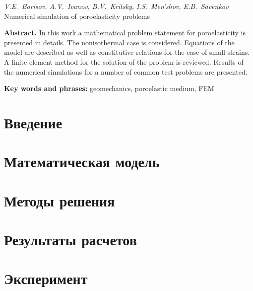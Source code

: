 \documentclass[a4paper, 12pt]{article}
\begin{document}
\noindent\emph{ V.E.~Borisov, \; A.V.~Ivanov, \; B.V.~Kritsky, \; I.S.~Men'shov, \; E.B.~Savenkov} \\Numerical simulation of poroelasticity problems

\vspace*{3mm}

\noindent\textbf{ Abstract.}
In this work a mathematical problem statement for poroelasticity is
presented in details. The nonisothermal case is considered.
Equations of the model are described as well as constitutive relations
for the case of small strains. A finite element method for the
solution of the problem is reviewed. Results of the numerical
simulations for a number of common test problems are presented.



\vspace*{3mm}

\noindent\textbf{Key words and phrases:} geomechanics, poroelastic medium, FEM

\tableofcontents


\newpage

\section{Введение}
\label{sec:intro}


\section{Математическая модель}
\label{sec:mat_model}
%


\section{Методы решения}
\label{sec:methods}
%



\section{Результаты расчетов}
\label{sec:results}
%


\section{Эксперимент}
\label{sec:experiment}
%

\end{document}
